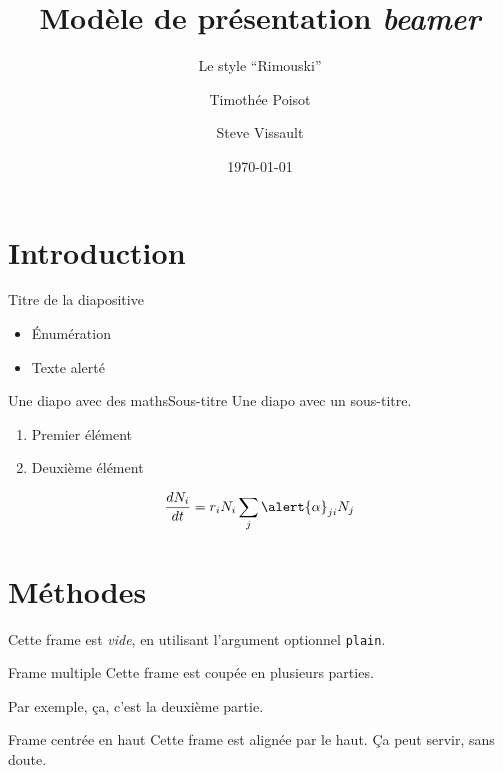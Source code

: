 \documentclass{eecslides}
\title[Modèle \emph{beamer}]{Modèle de présentation \emph{beamer}}
\subtitle{Le style ``Rimouski''}
\author[Tim \& Steve]{Timothée Poisot \and Steve Vissault}
\institute[Chaire de recherche EEC]{UQAR -- \emph{Theoretical Ecosystem Ecology}}
\date{\today} %
\begin{document}
	\begin{frame}[plain]
		\titlepage
	\end{frame}

	\section{Introduction}

	\begin{frame}{Titre de la diapositive}
	    
		\begin{itemize}
			\item Énumération
			\item Texte \alert{alerté} 
		\end{itemize}
	
	\end{frame}

	\begin{frame}{Une diapo avec des maths}{Sous-titre}
		Une diapo avec un sous-titre.

		\begin{enumerate}
			\item Premier élément
			\item Deuxième élément
		\end{enumerate}

		$$\frac{dN_i}{dt} = r_iN_i\sum_j\alert{\alpha}_{ji}N_j$$

	\end{frame}

	\section{Méthodes}

	\begin{frame}[plain]
		Cette frame est \emph{vide}, en utilisant l'argument optionnel \texttt{plain}.
	\end{frame}

	\begin{frame}[allowframebreaks]{Frame multiple}
		Cette frame est coupée en plusieurs parties.

		\framebreak

		Par exemple, ça, c'est la deuxième partie.
	\end{frame}

	\begin{frame}[t]{Frame centrée en haut}
	    Cette frame est alignée par le haut. Ça peut servir, sans doute.	
	\end{frame}
\end{document}

